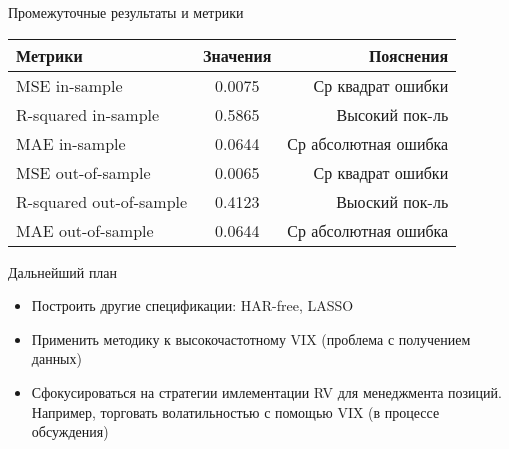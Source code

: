 \documentclass[11pt]{beamer} %
\begin{document}
    \begin{frame}{Промежуточные результаты и метрики}
        \begin{table}[h!]
            \centering
            \begin{tabular}{| l | c | r |}
                \hline
                Метрики & Значения & Пояснения \\
                \hline
                MSE in-sample  & 0.0075 & Ср квадрат ошибки \\
                R-squared in-sample & 0.5865  & Высокий пок-ль \\ [1ex]
                MAE in-sample & 0.0644 & Ср абсолютная ошибка \\
                MSE out-of-sample & 0.0065 & Ср квадрат ошибки\\
                R-squared out-of-sample & 0.4123 & Выоский пок-ль \\
                MAE out-of-sample & 0.0644 & Ср абсолютная ошибка\\
                \hline
            \end{tabular}
        \end{table}
    \end{frame}
    \begin{frame}{Дальнейший план}
        \begin{itemize}
            \item Построить другие спецификации: HAR-free, LASSO
            \item Применить методику к высокочастотному VIX (проблема с получением данных)
            \item Сфокусироваться на стратегии имлементации RV для менеджмента позиций. Например, торговать волатильностью с помощью VIX (в процессе обсуждения)
        \end{itemize}
    \end{frame}
\end{document}
